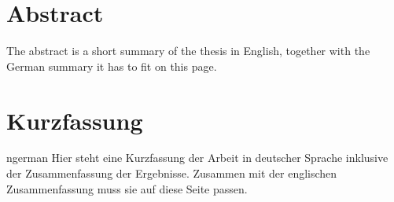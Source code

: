 \thispagestyle{plain}

\section*{Abstract}
The abstract is a short summary of the thesis in English, together with the German summary it has to fit on this page.

\section*{Kurzfassung}
\begin{foreignlanguage}{ngerman}
Hier steht eine Kurzfassung der Arbeit in deutscher Sprache inklusive der Zusammenfassung der
Ergebnisse.
Zusammen mit der englischen Zusammenfassung muss sie auf diese Seite passen.
\end{foreignlanguage}
